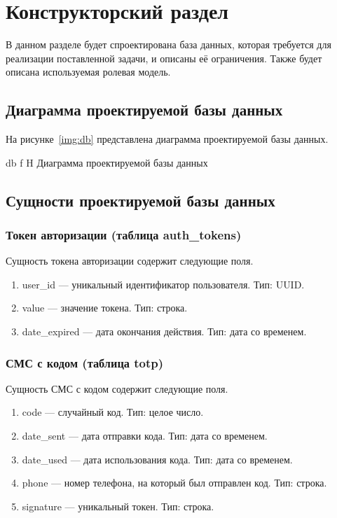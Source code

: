 \chapter{Конструкторский раздел}

В данном разделе будет спроектирована база данных, которая требуется для реализации поставленной задачи, и описаны её ограничения. Также будет описана используемая ролевая модель.

\section{Диаграмма проектируемой базы данных}

На рисунке~\ref{img:db} представлена диаграмма проектируемой базы данных.

{db}
{f}
{H}
{\textwidth}
{Диаграмма проектируемой базы данных}

\section{Сущности проектируемой базы данных}

\subsection{Токен авторизации (таблица auth\_tokens)}

Сущность токена авторизации содержит следующие поля.

\begin{enumerate}
	\item user\_id --- уникальный идентификатор пользователя. Тип: UUID.
	\item value --- значение токена. Тип: строка.
	\item date\_expired --- дата окончания действия. Тип: дата со временем.
\end{enumerate}

\subsection{СМС с кодом (таблица totp)}

Сущность СМС с кодом содержит следующие поля.

\begin{enumerate}
	\item code --- случайный код. Тип: целое число.
	\item date\_sent --- дата отправки кода. Тип: дата со временем.
	\item date\_used --- дата использования кода. Тип: дата со временем.
	\item phone --- номер телефона, на который был отправлен код. Тип: строка.
	\item signature --- уникальный токен. Тип: строка.
\end{enumerate}

